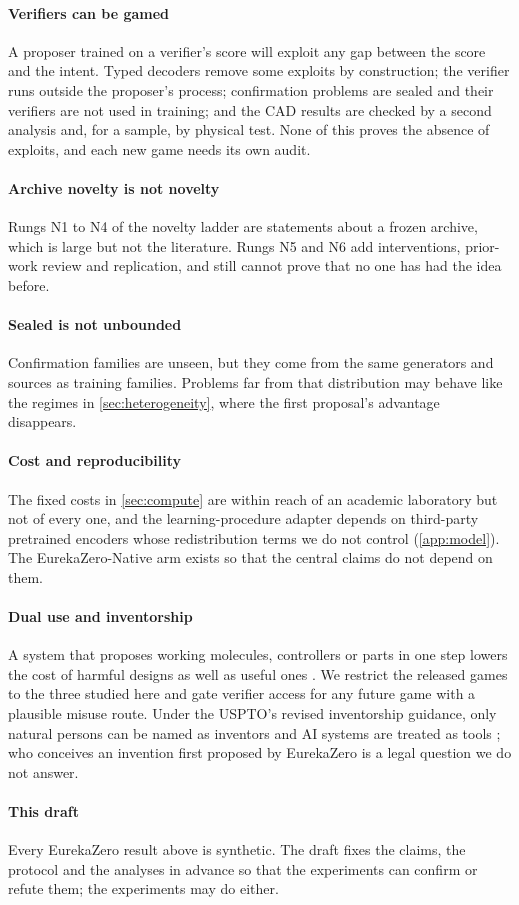 \paragraph{Verifiers can be gamed} A proposer trained on a verifier's score will exploit any gap
between the score and the intent. Typed decoders remove some exploits by construction; the verifier
runs outside the proposer's process; confirmation problems are sealed and their verifiers are not
used in training; and the CAD results are checked by a second analysis and, for a sample, by
physical test. None of this proves the absence of exploits, and each new game needs its own audit.

\paragraph{Archive novelty is not novelty} Rungs N1 to N4 of the novelty ladder are statements about
a frozen archive, which is large but not the literature. Rungs N5 and N6 add interventions, prior-work
review and replication, and still cannot prove that no one has had the idea before.

\paragraph{Sealed is not unbounded} Confirmation families are unseen, but they come from the same
generators and sources as training families. Problems far from that distribution may behave like the
regimes in \cref{sec:heterogeneity}, where the first proposal's advantage disappears.

\paragraph{Cost and reproducibility} The fixed costs in \cref{sec:compute} are within reach of an
academic laboratory but not of every one, and the learning-procedure adapter depends on third-party
pretrained encoders whose redistribution terms we do not control (\cref{app:model}). The
EurekaZero-Native arm exists so that the central claims do not depend on them.

\paragraph{Dual use and inventorship} A system that proposes working molecules, controllers or parts
in one step lowers the cost of harmful designs as well as useful ones \citep{urbina2022dualuse}. We
restrict the released games to the three studied here and gate verifier access for any future game
with a plausible misuse route. Under the USPTO's revised inventorship guidance, only natural persons
can be named as inventors and AI systems are treated as tools \citep{uspto2025inventorship}; who
conceives an invention first proposed by EurekaZero is a legal question we do not answer.

\paragraph{This draft} Every EurekaZero result above is synthetic. The draft fixes the claims, the
protocol and the analyses in advance so that the experiments can confirm or refute them; the
experiments may do either.
